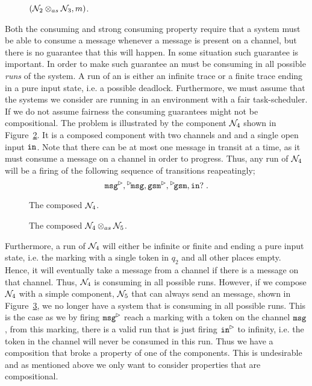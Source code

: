 \begin{figure}[ht]
    \centering
    
    \caption{$(\mathcal{N}_2 \otimes_{as} \mathcal{N}_3,m)$.}
    \label{fig:intro:aiopn-consuming}
\end{figure}

Both the consuming and strong consuming property require that a system must be able to consume a message whenever a message is present on a channel, but there is no guarantee that this will happen. In some situation such guarantee is important. In order to make such guarantee an \AIOPN must be consuming in all possible \emph{runs} of the system. A run of an \AIOPNs is either an infinite trace or a finite trace ending in a pure input state, i.e. a possible deadlock. Furthermore, we must assume that the systems we consider are running in an environment with a fair task-scheduler. If we do not assume fairness the consuming guarantees might not be compositional. The problem is illustrated by the \AIOPN component $\mathcal{N}_4$ shown in Figure~\ref{fig:intro:aiopn-prob-nec-consuming}. It is a composed component with two channels  and  and a single open input $\mathtt{in}$. Note that there can be at most one message in transit at a time, as it must consume a message on a channel in order to progress. Thus, any run of $\mathcal{N}_4$ will be a firing of the following sequence of transitions reapeatingly; 
\[
    \outact{\transition{msg}}, \inact{\transition{msg}}, \outact{\transition{gsm}}, \inact{\transition{gsm}}, \transition{in?}\;.
\]

\begin{figure}[ht]
    \centering
    
    \caption{The composed \AIOPN $\mathcal{N}_4$.}
    \label{fig:intro:aiopn-prob-nec-consuming}
\end{figure}

\begin{figure}[ht]
    \centering
    
    \caption{The composed \AIOPN $\mathcal{N}_4\otimes_{as}\mathcal{N}_5$.}
    \label{fig:intro:aiopn-prob-nec-consuming-w-in}
\end{figure}

Furthermore, a run of $\mathcal{N}_4$ will either be infinite or finite and ending a pure input state, i.e. the marking with a single token in $q_2$ and all other places empty. Hence, it will eventually take a message from a channel if there is a message on that channel. Thus, $\mathcal{N}_4$ is consuming in all possible runs. However, if we compose $\mathcal{N}_4$ with a simple component, $\mathcal{N}_5$ that can always send an  message, shown in Figure~\ref{fig:intro:aiopn-prob-nec-consuming-w-in}, we no longer have a system that is consuming in all possible runs. This is the case as we by firing $\outact{\transition{msg}}$ reach a marking with a token on the channel $\mathtt{msg}$, from this marking, there is a valid run that is just firing $\outact{\transition{in}}$ to infinity, i.e. the token in the channel  will never be consumed in this run. Thus we have a composition that broke a property of one of the components. This is undesirable and as mentioned above we only want to consider properties that are compositional. 

